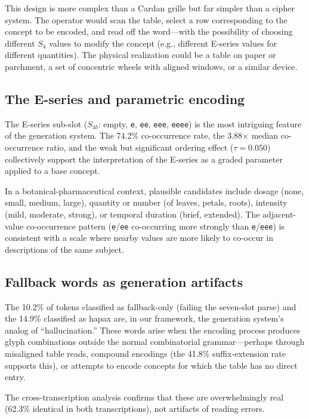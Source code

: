 \documentclass[12pt]{article}
\begin{document}
This design is more complex than a Cardan grille but far simpler than a cipher system. The operator would scan the table, select a row corresponding to the concept to be encoded, and read off the word---with the possibility of choosing different $S_4$ values to modify the concept (e.g., different E-series values for different quantities). The physical realization could be a table on paper or parchment, a set of concentric wheels with aligned windows, or a similar device.

\subsection{The E-series and parametric encoding}

The E-series sub-slot ($S_{4b}$: empty, \texttt{e}, \texttt{ee}, \texttt{eee}, \texttt{eeee}) is the most intriguing feature of the generation system. The 74.2\% co-occurrence rate, the 3.88$\times$ median co-occurrence ratio, and the weak but significant ordering effect ($\tau = 0.050$) collectively support the interpretation of the E-series as a graded parameter applied to a base concept.

In a botanical-pharmaceutical context, plausible candidates include dosage (none, small, medium, large), quantity or number (of leaves, petals, roots), intensity (mild, moderate, strong), or temporal duration (brief, extended). The adjacent-value co-occurrence pattern (\texttt{e}/\texttt{ee} co-occurring more strongly than \texttt{e}/\texttt{eee}) is consistent with a scale where nearby values are more likely to co-occur in descriptions of the same subject.

\subsection{Fallback words as generation artifacts}

The 10.2\% of tokens classified as fallback-only (failing the seven-slot parse) and the 14.9\% classified as hapax are, in our framework, the generation system's analog of ``hallucination.'' These words arise when the encoding process produces glyph combinations outside the normal combinatorial grammar---perhaps through misaligned table reads, compound encodings (the 41.8\% suffix-extension rate supports this), or attempts to encode concepts for which the table has no direct entry.

The cross-transcription analysis confirms that these are overwhelmingly real (62.3\% identical in both transcriptions), not artifacts of reading errors.
\end{document}
